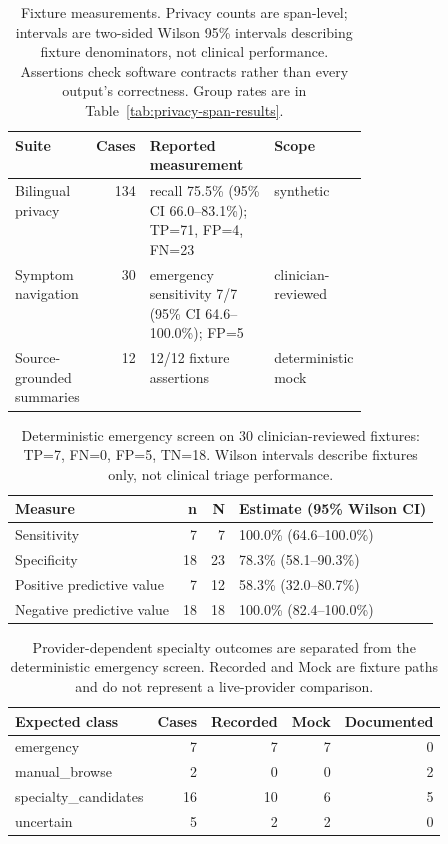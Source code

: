 \begin{table}[!htbp]
\caption{Fixture measurements. Privacy counts are span-level; intervals are two-sided Wilson 95\% intervals describing fixture denominators, not clinical performance. Assertions check software contracts rather than every output's correctness. Group rates are in Table~\ref{tab:privacy-span-results}.}
\label{tab:safety-results}
\centering\small
\begin{tabularx}{\linewidth}{@{}L{0.23\linewidth}rYL{0.18\linewidth}@{}}
\toprule
Suite & Cases & Reported measurement & Scope \\
\midrule
Bilingual privacy & 134 & recall 75.5\% (95\% CI 66.0--83.1\%); TP=71, FP=4, FN=23 & synthetic \\
\midrule
Symptom navigation & 30 & emergency sensitivity 7/7 (95\% CI 64.6--100.0\%); FP=5 & clinician-reviewed \\
\midrule
Source-grounded summaries & 12 & 12/12 fixture assertions & deterministic mock \\
\bottomrule
\end{tabularx}

\end{table}
\begin{table}[!htbp]
\caption{Deterministic emergency screen on 30 clinician-reviewed fixtures: TP=7, FN=0, FP=5, TN=18. Wilson intervals describe fixtures only, not clinical triage performance.}
\label{tab:navigation-emergency-results}
\centering\small
\begin{tabular}{@{}lrrl@{}}
\toprule
Measure & n & N & Estimate (95\% Wilson CI) \\
\midrule
Sensitivity & 7 & 7 & 100.0\% (64.6--100.0\%) \\
\midrule
Specificity & 18 & 23 & 78.3\% (58.1--90.3\%) \\
\midrule
Positive predictive value & 7 & 12 & 58.3\% (32.0--80.7\%) \\
\midrule
Negative predictive value & 18 & 18 & 100.0\% (82.4--100.0\%) \\
\bottomrule
\end{tabular}

\end{table}
\begin{table}[!htbp]
\caption{Provider-dependent specialty outcomes are separated from the deterministic emergency screen. Recorded and Mock are fixture paths and do not represent a live-provider comparison.}
\label{tab:navigation-agreement-results}
\centering\small
\begin{tabular}{@{}lrrrr@{}}
\toprule
Expected class & Cases & Recorded & Mock & Documented \\
\midrule
emergency & 7 & 7 & 7 & 0 \\
\midrule
manual\_browse & 2 & 0 & 0 & 2 \\
\midrule
specialty\_candidates & 16 & 10 & 6 & 5 \\
\midrule
uncertain & 5 & 2 & 2 & 0 \\
\bottomrule
\end{tabular}

\end{table}
